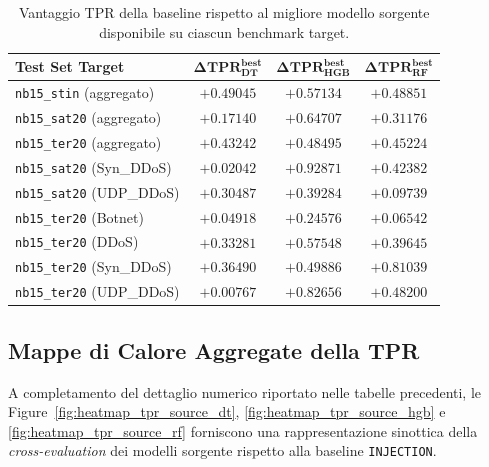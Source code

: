 \begin{table}[H]
    \centering
    \footnotesize
    \caption{Vantaggio TPR della baseline rispetto al migliore modello sorgente disponibile su ciascun benchmark target.}
    \label{tab:source_vs_base_best_source_delta}
    \begin{tabular}{lccc}
        \toprule
        \textbf{Test Set Target} & $\boldsymbol{\Delta TPR^{best}_{DT}}$ & $\boldsymbol{\Delta TPR^{best}_{HGB}}$ & $\boldsymbol{\Delta TPR^{best}_{RF}}$ \\
        \midrule
        \texttt{nb15\_stin} (aggregato) & $+0.49045$ & $+0.57134$ & $+0.48851$ \\
        \texttt{nb15\_sat20} (aggregato) & $+0.17140$ & $+0.64707$ & $+0.31176$ \\
        \texttt{nb15\_ter20} (aggregato) & $+0.43242$ & $+0.48495$ & $+0.45224$ \\
        \texttt{nb15\_sat20} (Syn\_DDoS) & $+0.02042$ & $+0.92871$ & $+0.42382$ \\
        \texttt{nb15\_sat20} (UDP\_DDoS) & $+0.30487$ & $+0.39284$ & $+0.09739$ \\
        \texttt{nb15\_ter20} (Botnet) & $+0.04918$ & $+0.24576$ & $+0.06542$ \\
        \texttt{nb15\_ter20} (DDoS) & $+0.33281$ & $+0.57548$ & $+0.39645$ \\
        \texttt{nb15\_ter20} (Syn\_DDoS) & $+0.36490$ & $+0.49886$ & $+0.81039$ \\
        \texttt{nb15\_ter20} (UDP\_DDoS) & $+0.00767$ & $+0.82656$ & $+0.48200$ \\
        \bottomrule
    \end{tabular}
\end{table}



\subsection{Mappe di Calore Aggregate della TPR}
\label{app:heatmap_tpr_sorgente}

A completamento del dettaglio numerico riportato nelle tabelle precedenti, le Figure~\ref{fig:heatmap_tpr_source_dt}, \ref{fig:heatmap_tpr_source_hgb} e \ref{fig:heatmap_tpr_source_rf} forniscono una rappresentazione sinottica della \textit{cross-evaluation} dei modelli sorgente rispetto alla baseline \texttt{INJECTION}.

